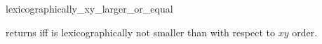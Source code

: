 \begin{ccRefFunction}{lexicographically_xy_larger_or_equal}

{returns  iff  is lexicographically not smaller
than  with respect to $xy$ order.}
\end{ccRefFunction}

